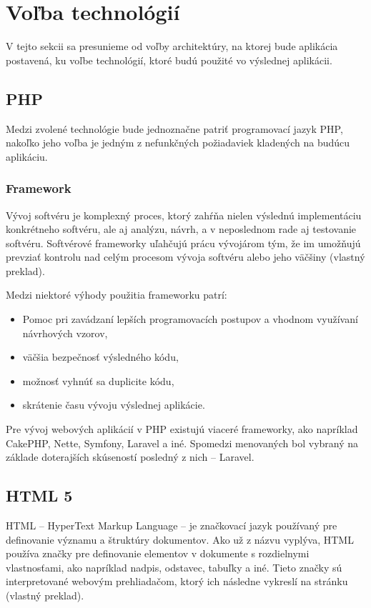 \pagebreak

\section{Voľba technológií}
V tejto sekcii sa presunieme od voľby architektúry, na ktorej bude aplikácia postavená, ku voľbe technológií, ktoré budú použité vo výslednej aplikácii.

\subsection{PHP}
Medzi zvolené technológie bude jednoznačne patriť programovací jazyk PHP, nakoľko jeho voľba je jedným z nefunkčných požiadaviek kladených na budúcu aplikáciu. 

\subsubsection*{Framework}
Vývoj softvéru je komplexný proces, ktorý zahŕňa nielen výslednú implementáciu konkrétneho softvéru, ale aj analýzu, návrh, a v neposlednom rade aj testovanie softvéru. Softvérové frameworky uľahčujú prácu vývojárom tým, že im umožňujú prevziať kontrolu nad celým procesom vývoja softvéru alebo jeho väčšiny \cite{co-je-framework} (vlastný preklad).

Medzi niektoré výhody použitia frameworku patrí:

\begin{itemize}
	\item Pomoc pri zavádzaní lepších programovacích postupov a vhodnom využívaní návrhových vzorov,
	\item väčšia bezpečnosť výsledného kódu,
	\item možnosť vyhnúť sa duplicite kódu,
	\item skrátenie času vývoju výslednej aplikácie.
\end{itemize}

Pre vývoj webových aplikácií v PHP existujú viaceré frameworky, ako napríklad CakePHP, Nette, Symfony, Laravel a iné.
Spomedzi menovaných bol vybraný na základe doterajších skúseností posledný z nich -- Laravel.

\subsection{HTML 5}
HTML -- HyperText Markup Language -- je značkovací jazyk používaný pre definovanie významu a štruktúry dokumentov. Ako už z názvu vyplýva, HTML používa značky pre definovanie elementov v dokumente s rozdielnymi vlastnosťami, ako napríklad nadpis, odstavec, tabuľky a iné.
Tieto značky sú interpretované webovým prehliadačom, ktorý ich následne vykreslí na stránku \cite{co-je-html} (vlastný preklad).

